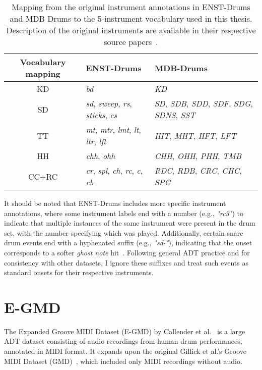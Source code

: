 \begin{table}[H]
    \centering
    \hspace*{-0.6cm}
    \begin{tabular}{c|ll}
        Vocabulary mapping & ENST-Drums & MDB-Drums \\
        \hline
        \acrfull{KD} & \textit{bd} & \textit{KD} \\
        \acrfull{SD} & \textit{sd}, \textit{sweep}, \textit{rs}, \textit{sticks}, \textit{cs} & \textit{SD}, \textit{SDB}, \textit{SDD}, \textit{SDF}, \textit{SDG}, \textit{SDNS}, \textit{SST} \\
        \acrfull{TT} & \textit{mt}, \textit{mtr}, \textit{lmt}, \textit{lt}, \textit{ltr}, \textit{lft} & \textit{HIT}, \textit{MHT}, \textit{HFT}, \textit{LFT} \\
        \acrfull{HH} & \textit{chh}, \textit{ohh} & \textit{CHH}, \textit{OHH}, \textit{PHH}, \textit{TMB} \\
        \acrfull{CC+RC} & \textit{cr}, \textit{spl}, \textit{ch}, \textit{rc}, \textit{c}, \textit{cb} & \textit{RDC}, \textit{RDB}, \textit{CRC}, \textit{CHC}, \textit{SPC} \\
    \end{tabular}
    \caption{Mapping from the original instrument annotations in ENST-Drums and MDB Drums to the 5-instrument vocabulary used in this thesis. Description of the original instruments are available in their respective source papers~\cite{gillet2006enst, southall2017mdb}.}
    \label{ENSTMDBMapping}
\end{table}

It should be noted that ENST-Drums includes more specific instrument annotations, where some instrument labels end with a number (e.g., \textit{"rc3"}) to indicate that multiple instances of the same instrument were present in the drum set, with the number specifying which was played. Additionally, certain snare drum events end with a hyphenated suffix (e.g., \textit{"sd-"}), indicating that the onset corresponds to a softer \textit{ghost note} hit~\cite{gillet2006enst}. Following general \gls{ADT} practice and for consistency with other datasets, I ignore these suffixes and treat such events as standard onsets for their respective instruments.

\section{E-GMD}

The Expanded Groove MIDI Dataset (E-GMD) by Callender et al.~\cite{callender2020improvingperceptualqualitydrum} is a large \gls{ADT} dataset consisting of audio recordings from human drum performances, annotated in MIDI format. It expands upon the original Gillick et al.'s Groove MIDI Dataset (GMD)~\cite{pmlr-v97-gillick19a}, which included only MIDI recordings without audio.

